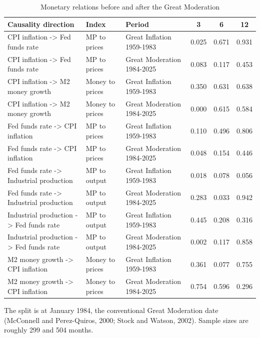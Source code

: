\begin{table}[htbp]
\centering
\caption{Monetary relations before and after the Great Moderation}
\label{tab:macrosub}
\small
\begin{tabular}{lllccc}
\toprule
Causality direction & Index & Period & 3 & 6 & 12 \\
\midrule
CPI inflation -> Fed funds rate & MP to prices & Great Inflation 1959-1983 & 0.025 & 0.671 & 0.931 \\
CPI inflation -> Fed funds rate & MP to prices & Great Moderation 1984-2025 & 0.083 & 0.117 & 0.453 \\
CPI inflation -> M2 money growth & Money to prices & Great Inflation 1959-1983 & 0.350 & 0.631 & 0.638 \\
CPI inflation -> M2 money growth & Money to prices & Great Moderation 1984-2025 & 0.000 & 0.615 & 0.584 \\
Fed funds rate -> CPI inflation & MP to prices & Great Inflation 1959-1983 & 0.110 & 0.496 & 0.806 \\
Fed funds rate -> CPI inflation & MP to prices & Great Moderation 1984-2025 & 0.048 & 0.154 & 0.446 \\
Fed funds rate -> Industrial production & MP to output & Great Inflation 1959-1983 & 0.018 & 0.078 & 0.056 \\
Fed funds rate -> Industrial production & MP to output & Great Moderation 1984-2025 & 0.283 & 0.033 & 0.942 \\
Industrial production -> Fed funds rate & MP to output & Great Inflation 1959-1983 & 0.445 & 0.208 & 0.316 \\
Industrial production -> Fed funds rate & MP to output & Great Moderation 1984-2025 & 0.002 & 0.117 & 0.858 \\
M2 money growth -> CPI inflation & Money to prices & Great Inflation 1959-1983 & 0.361 & 0.077 & 0.755 \\
M2 money growth -> CPI inflation & Money to prices & Great Moderation 1984-2025 & 0.754 & 0.596 & 0.296 \\
\bottomrule
\end{tabular}

\begin{minipage}{\linewidth}\footnotesize
The split is at January 1984, the conventional Great Moderation date (McConnell and Perez-Quiros, 2000; Stock and Watson, 2002).  Sample sizes are roughly 299 and 504 months.
\end{minipage}
\end{table}
